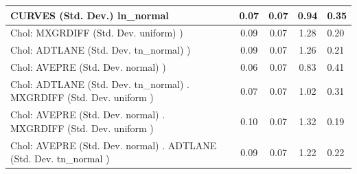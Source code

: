 \begin{table}
\begin{center}
\begin{tabular}{|l|l|c|c|c|l|}
			\hline
			CURVES (Std. Dev.) ln_normal &  & 0.07 & 0.07 & 0.94 & 0.35 \\
			\hline
			 Chol: MXGRDIFF (Std. Dev. uniform) ) &  & 0.09 & 0.07 & 1.28 & 0.20 \\
			\hline
			 Chol: ADTLANE (Std. Dev. tn_normal) ) &  & 0.09 & 0.07 & 1.26 & 0.21 \\
			\hline
			 Chol: AVEPRE (Std. Dev. normal) ) &  & 0.06 & 0.07 & 0.83 & 0.41 \\
			\hline
			 Chol: ADTLANE (Std. Dev. tn_normal) . MXGRDIFF (Std. Dev.   uniform ) &  & 0.07 & 0.07 & 1.02 & 0.31 \\
			\hline
			 Chol: AVEPRE (Std. Dev. normal) . MXGRDIFF (Std. Dev.   uniform ) &  & 0.10 & 0.07 & 1.32 & 0.19 \\
			\hline
			 Chol: AVEPRE (Std. Dev. normal) . ADTLANE (Std. Dev.   tn_normal ) &  & 0.09 & 0.07 & 1.22 & 0.22 \\
			\hline
		\end{tabular}
	\end{center}
\end{table}